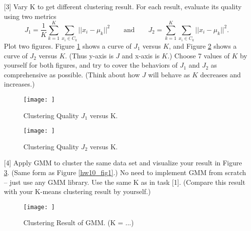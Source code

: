 \documentclass{llncs}
\begin{document}
[3] Vary K to get different clustering result. 
For each result, evaluate its quality using  
two metrics 
\begin{equation}
J_{1} = \frac{1}{K} 
\sum_{k = 1}^{K} \sum_{x_{i} \in C_{k}} 
|| x_{i} - \mu_{k} ||^{2} \qquad 
\text{and} \qquad 
J_{2} = \sum_{k = 1}^{K} \sum_{x_{i} \in C_{k}} 
|| x_{i} - \mu_{k} ||^{2}. 
\end{equation}
Plot two figures. Figure \ref{hw10_fig4} 
shows a curve of $J_{1}$ versus $K$, and 
Figure \ref{hw10_fig5} shows a curve of $J_{2}$ 
versus $K$. (Thus y-axis is $J$ and x-axis is $K$.) 
Choose 7 values of $K$ by yourself for both figures,
and try to cover the behaviors of $J_{1}$ and
$J_{2}$ as comprehensive 
as possible. (Think about how $J$ will behave 
as $K$ decreases and increases.)


\begin{figure}[h!] 
\centering 
\texttt{[image: ]} 
\caption{Clustering Quality 
$J_{1}$ versus K.} 
\label{hw10_fig4}
\end{figure}

\begin{figure}[h!] 
\centering 
\texttt{[image: ]} 
\caption{Clustering Quality $J_{2}$ versus K.} 
\label{hw10_fig5}
\end{figure}

[4] Apply GMM to cluster the same data set 
and visualize your result in Figure \ref{hw10_fig6}. 
(Same form as Figure \ref{hw10_fig1}.) 
No need to implement GMM from scratch -- just 
use any GMM library. Use the same K as in task 
[1]. (Compare this result with your 
K-means clustering result by yourself.) 

\begin{figure}[h!] 
\centering 
\texttt{[image: ]} 
\caption{Clustering Result of GMM. (K = ...)} 
\label{hw10_fig6}
\end{figure}
\end{document}
